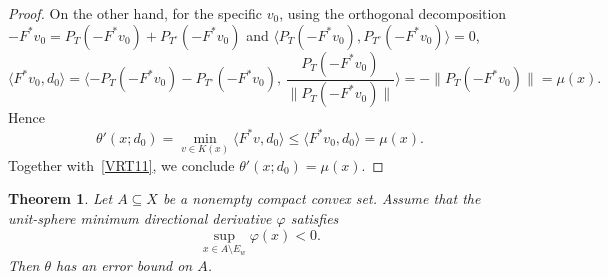 \documentclass[11pt]{article}
\newtheorem{theorem}{Theorem}[section]
\begin{document}
\begin{proof}
	On the other hand, for the specific $v_0$, using the orthogonal decomposition $-F^*v_0 = P_T(-F^*v_0) + P_{T^\circ}(-F^*v_0)$ and $\langle P_T(-F^*v_0), P_{T^\circ}(-F^*v_0)\rangle = 0$,
	\[
	\langle F^*v_0, d_0\rangle = \langle -P_T(-F^*v_0) - P_{T^\circ}(-F^*v_0),\, \frac{P_T(-F^*v_0)}{\|P_T(-F^*v_0)\|} \rangle 
	= -\|P_T(-F^*v_0)\| = \mu(x).
	\]
	Hence
	\[
	\theta'(x;d_0) = \min_{v\in K(x)} \langle F^*v, d_0\rangle \le \langle F^*v_0, d_0\rangle = \mu(x).
	\]
	Together with~\eqref{VRT11}, we conclude $\theta'(x;d_0) = \mu(x)$.
\end{proof}








 


 

 
 \begin{theorem}  \label{TXEvQ} 
 	Let \(A \subseteq X\) be a nonempty  compact convex set. Assume that the unit-sphere minimum directional derivative \(\varphi\) satisfies
 	\[
 	\sup_{x \in A \setminus E_w} \varphi(x) < 0.
 	\]
 	Then $\theta$ has an error bound on $A$.
 \end{theorem}
 
\end{document}
